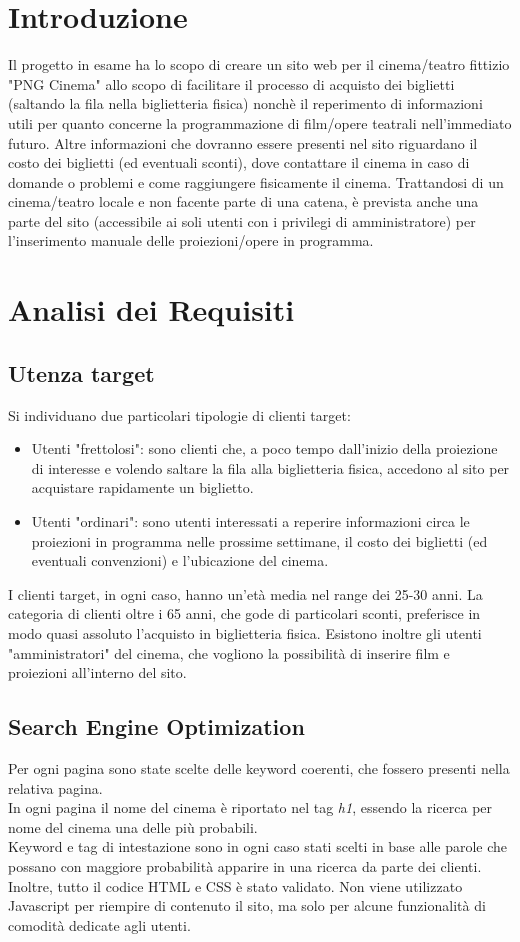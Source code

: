 \documentclass[a4paper, 12pt]{article}
\begin{document}
\makefrontpage

\section{Introduzione}
Il progetto in esame ha lo scopo di creare un sito web per il cinema/teatro fittizio "PNG Cinema" allo scopo di facilitare il processo di acquisto dei biglietti (saltando la fila nella biglietteria fisica) nonchè
il reperimento di informazioni utili per quanto concerne la programmazione di film/opere teatrali nell'immediato futuro.
Altre informazioni che dovranno essere presenti nel sito riguardano il costo dei biglietti (ed eventuali sconti), dove contattare il cinema in caso di domande o problemi e come raggiungere fisicamente il cinema.
Trattandosi di un cinema/teatro locale e non facente parte di una catena, è prevista anche una parte del sito (accessibile ai soli utenti con i privilegi di amministratore) per l'inserimento manuale delle proiezioni/opere in programma.

\section{Analisi dei Requisiti}
\subsection{Utenza target}
Si individuano due particolari tipologie di clienti target:
\begin{itemize}
    \item Utenti "frettolosi": sono clienti che, a poco tempo dall'inizio della proiezione di interesse e volendo saltare la fila alla biglietteria fisica, accedono al sito per acquistare rapidamente un biglietto.
    \\\item Utenti "ordinari": sono utenti interessati a reperire informazioni circa le proiezioni in programma nelle prossime settimane, il costo dei biglietti (ed eventuali convenzioni) e l'ubicazione del cinema.
\end{itemize}
I clienti target, in ogni caso, hanno un'età media nel range dei 25-30 anni. La categoria di clienti oltre i 65 anni, che gode di particolari sconti, preferisce in modo quasi assoluto l'acquisto in biglietteria fisica.
Esistono inoltre gli utenti "amministratori" del cinema, che vogliono la possibilità di inserire film e proiezioni all'interno del sito.
\subsection{Search Engine Optimization}
Per ogni pagina sono state scelte delle keyword coerenti, che fossero presenti nella relativa pagina.\\
In ogni pagina il nome del cinema è riportato nel tag \textit{h1}, essendo la ricerca per nome del cinema una delle più probabili.\\
Keyword e tag di intestazione sono in ogni caso stati scelti in base alle parole che possano con maggiore probabilità apparire in una ricerca da parte dei clienti.
Inoltre, tutto il codice HTML e CSS è stato validato.
Non viene utilizzato Javascript per riempire di contenuto il sito, ma solo per alcune funzionalità di comodità dedicate agli utenti.
\newpage
\end{document}
